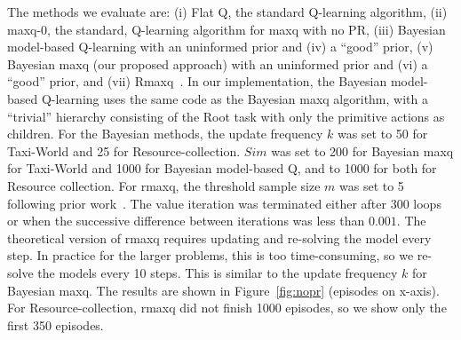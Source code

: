 The methods we evaluate are: (i) Flat Q, the standard
 Q-learning algorithm, (ii) {\sc maxq-0}, the standard,
 Q-learning algorithm for {\sc maxq} with no
PR, (iii) Bayesian model-based Q-learning with an
uninformed prior and (iv) a ``good'' prior, (v) Bayesian {\sc maxq}
(our proposed approach) with an uninformed prior and (vi) a
``good'' prior, and (vii) {\sc Rmaxq}~\cite{rmax-maxq}. In our
implementation, the Bayesian model-based Q-learning uses the same code
as the Bayesian {\sc maxq} algorithm, with a ``trivial'' hierarchy
consisting of the Root task with only the primitive actions as
children. For the Bayesian methods, the update frequency $k$ was set
to 50 for {\sf Taxi-World} and 25 for {\sf Resource-collection}. $Sim$
was set to 200 for Bayesian {\sc maxq} for {\sf Taxi-World} and 1000
for Bayesian model-based Q, and to 1000 for both for {\sf Resource
collection}. For {\sc rmaxq}, the threshold sample size $m$ was set to
5 following prior work~\cite{rmax-maxq}. The value iteration was
terminated either after 300 loops or when the successive difference
between iterations was less than $0.001$. The theoretical version of
{\sc rmaxq} requires updating and re-solving the model every
step. In practice for the larger problems, this is too time-consuming,
so we re-solve the models every 10 steps. This is similar to the update frequency $k$ for Bayesian {\sc maxq}. 
The results are shown in Figure~\ref{fig:nopr} (episodes on x-axis). For {\sf Resource-collection}, {\sc rmaxq} did not finish 1000 episodes, so we show only the first 350 episodes.

